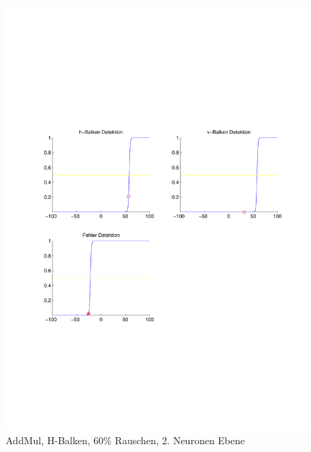 \begin{figure}[hbt]
\begin{minipage}{0.8 \textwidth}
		\includegraphics[width=\textwidth]{./Bilder/Auswertung/Endergebnis/TypeAddMul_Rauschen60_H_Line_Layer2}
		\caption{AddMul, H-Balken, 60\% Rauschen, 2. Neuronen Ebene}
		\label{AddMul_H_60_2}
	\end{minipage}
\end{figure}

